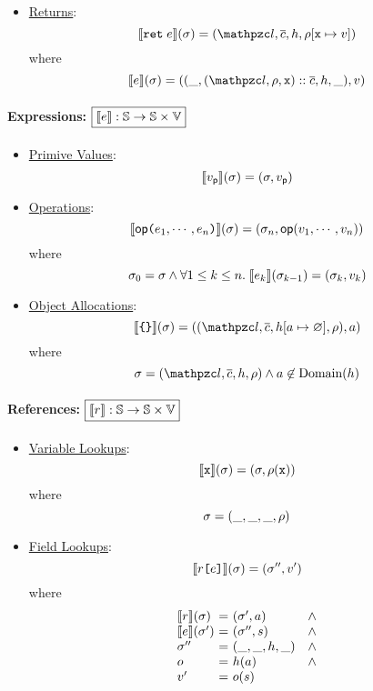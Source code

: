 \begin{itemize}
  \item \underline{Returns}:
    \[
      \sem{\kwret \; \expr}(\st) = (\lab, \ctxts, \heap, \env[\varx \mapsto
      \val])
    \]
    where
    \[
      \sem{\expr}(\st) = ((\_, (\lab, \env, \varx) :: \ctxts, \heap, \_), \val)
    \]
\end{itemize}

\paragraph{Expressions: $\framebox{$\sem{\expr}: \stset \rightarrow \stset
\times \valset$}$}
\begin{itemize}
  \item \underline{Primive Values}:
    \[
      \llbracket{v_{\textsf{p}}}\rrbracket(\sigma) =
      (\sigma, v_{\textsf{p}})
    \]
  \item \underline{Operations}:
    \[
      \llbracket{\textsf{op}\texttt{(}e_1, \cdots, e_n \texttt{)}}\rrbracket(\sigma) =
      (\sigma_n, \textsf{op}(v_1, \cdots, v_n))
    \]
    where
    \[
      \sigma_0 = \sigma \wedge
      \forall 1 \leq k \leq n. \; \llbracket{e_k}\rrbracket(\sigma_{k-1}) = (\sigma_k, v_k)
    \]
  \item \underline{Object Allocations}:
    \[
      \sem{\kwcl \kwcr}(\st) =
      ((\lab, \ctxts, \heap[\addr \mapsto \varnothing], \env), \addr)
    \]
    where
    \[
      \st = (\lab, \ctxts, \heap, \env) \wedge
      \addr \not\in \text{Domain}(\heap)
    \]
\end{itemize}

\paragraph{References: $\framebox{$\sem{\refer}: \stset \rightarrow \stset
\times \valset$}$}
\begin{itemize}
  \item \underline{Variable Lookups}:
    \[
      \llbracket{\texttt{x}}\rrbracket(\sigma) =
      (\sigma, \rho(\texttt{x}))
    \]
    where
    \[
      \sigma = (\_, \_, \_, \rho)
    \]
  \item \underline{Field Lookups}:
    \[
      \llbracket{r\texttt{[}e\texttt{]}}\rrbracket(\sigma) =
      (\sigma'', v')
    \]
    where
    \[
      \begin{array}{l@{~}c@{~}ll}
        \sem{\refer}(\st) &=& (\st', \addr) &\wedge\\
        \sem{\expr}(\st') &=& (\st'', \str) &\wedge\\
        \st'' &=& (\_, \_, \heap, \_) &\wedge\\
        \obj &=& \heap(\addr) &\wedge\\
        \val' &=& \obj(\str)\\
      \end{array}
    \]
\end{itemize}





